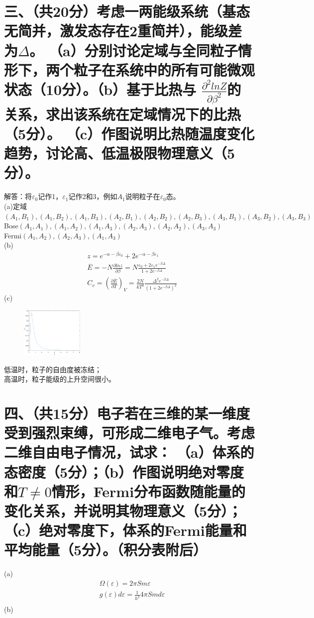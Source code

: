 \documentclass[UTF8]{ctexart}
\begin{document}
\section*{三、（共20分）考虑一两能级系统（基态无简并，激发态存在2重简并），能级差为$\Delta$。
  （a）分别讨论定域与全同粒子情形下，两个粒子在系统中的所有可能微观状态（10分）。（b）基于比热与
  $\frac{\partial^2lnZ}{\partial\beta^2}$的关系，求出该系统在定域情况下的比热（5分）。
  （c）作图说明比热随温度变化趋势，讨论高、低温极限物理意义（5分）。}
解答：将$\varepsilon_0$记作1，$\varepsilon_1$记作2和3，例如$A_1$说明粒子在$\varepsilon_0$态。\\
(a)定域$(A_1,B_1),(A_1,B_2),(A_1,B_3),(A_2,B_1),(A_2,B_2),(A_2,B_3),(A_3,B_1),(A_3,B_2),(A_3,B_3)$\\
Bose$(A_1,A_1),(A_1,A_2),(A_1,A_3),(A_2,A_3),(A_2,A_2),(A_3,A_3)$\\
Fermi$(A_1,A_2),(A_2,A_3),(A_1,A_3)$\\
(b)
\begin{equation*}
  \begin{aligned}
     & z=e^{-\alpha-\beta\varepsilon_0}+2e^{-\alpha-\beta\varepsilon_1}        \\
     & \overline{E}=-N\frac{\partial lnz}{\partial\beta}
    =N\frac{\varepsilon_0+2\varepsilon_1e^{-\beta\Delta}}{1+2e^{-\beta\Delta}} \\
     & C_v=(\frac{\partial\overline{E}}{\partial T})_V
    =\frac{2N}{kT^2}\frac{\Delta^2e^{-\beta\Delta}}{(1+2e^{-\beta\Delta})^2}
  \end{aligned}
\end{equation*}
(c)
\begin{figure}
  \includegraphics[width=3cm]{3c.png}
\end{figure}
\newline
低温时，粒子的自由度被冻结；\\
高温时，粒子能级的上升空间很小。\\
\newline\newline
\section*{四、（共15分）电子若在三维的某一维度受到强烈束缚，可形成二维电子气。考虑二维自由电子情况，试求：
  （a）体系的态密度（5分）；（b）作图说明绝对零度和$T\neq0$情形，Fermi分布函数随能量的变化关系，并说明其物理意义（5分）；
  （c）绝对零度下，体系的Fermi能量和平均能量（5分）。（积分表附后）}
 (a)
\begin{equation*}
  \begin{aligned}
     & \Omega(\varepsilon)=2\pi Sm\varepsilon                      \\
     & g(\varepsilon)d\varepsilon=\frac{1}{h^2}4\pi Smd\varepsilon \\
  \end{aligned}
\end{equation*}
(b)
\end{document}
